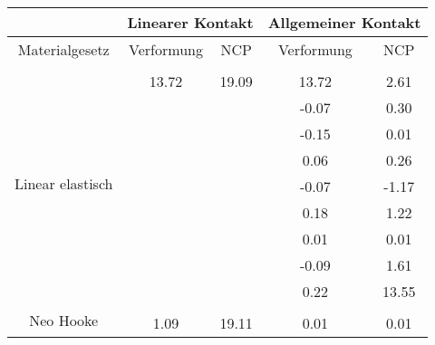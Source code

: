 \begin{table} 
\centering 
\begin{tabular}{c|cc|cc|} 
\cline{2-5} 
 & \multicolumn{2}{|c|}{Linearer Kontakt} & \multicolumn{2}{|c|}{Allgemeiner Kontakt} \\ 
\hline 
\multicolumn{1}{|c|}{Materialgesetz} & \multicolumn{1}{c|}{Verformung} & \multicolumn{1}{c|}{NCP} & \multicolumn{1}{c|}{Verformung} & \multicolumn{1}{c|}{NCP} \\ 
\hline 
\multicolumn{1}{|c|}{\multirow{10}{*}{Linear elastisch}} &\multicolumn{1}{|c|}{} & \multicolumn{1}{|c|}{} & \multicolumn{1}{|c|}{} & \multicolumn{1}{|c|}{} \\ 
\multicolumn{1}{|c|}{} & \multicolumn{1}{|c|}{     13.72} & \multicolumn{1}{|c|}{     19.09} & \multicolumn{1}{|c|}{     13.72} & \multicolumn{1}{|c|}{      2.61} \\ 
\multicolumn{1}{|c|}{} & \multicolumn{1}{|c|}{} & \multicolumn{1}{|c|}{} & \multicolumn{1}{|c|}{     -0.07} & \multicolumn{1}{|c|}{      0.30} \\ 
\multicolumn{1}{|c|}{} & \multicolumn{1}{|c|}{} & \multicolumn{1}{|c|}{} & \multicolumn{1}{|c|}{     -0.15} & \multicolumn{1}{|c|}{      0.01} \\ 
\multicolumn{1}{|c|}{} & \multicolumn{1}{|c|}{} & \multicolumn{1}{|c|}{} & \multicolumn{1}{|c|}{      0.06} & \multicolumn{1}{|c|}{      0.26} \\ 
\multicolumn{1}{|c|}{} & \multicolumn{1}{|c|}{} & \multicolumn{1}{|c|}{} & \multicolumn{1}{|c|}{     -0.07} & \multicolumn{1}{|c|}{     -1.17} \\ 
\multicolumn{1}{|c|}{} & \multicolumn{1}{|c|}{} & \multicolumn{1}{|c|}{} & \multicolumn{1}{|c|}{      0.18} & \multicolumn{1}{|c|}{      1.22} \\ 
\multicolumn{1}{|c|}{} & \multicolumn{1}{|c|}{} & \multicolumn{1}{|c|}{} & \multicolumn{1}{|c|}{      0.01} & \multicolumn{1}{|c|}{      0.01} \\ 
\multicolumn{1}{|c|}{} & \multicolumn{1}{|c|}{} & \multicolumn{1}{|c|}{} & \multicolumn{1}{|c|}{     -0.09} & \multicolumn{1}{|c|}{      1.61} \\ 
\multicolumn{1}{|c|}{} & \multicolumn{1}{|c|}{} & \multicolumn{1}{|c|}{} & \multicolumn{1}{|c|}{      0.22} & \multicolumn{1}{|c|}{     13.55} \\ 
\hline 
\multicolumn{1}{|c|}{\multirow{9}{*}{Neo Hooke}} &\multicolumn{1}{|c|}{} & \multicolumn{1}{|c|}{} & \multicolumn{1}{|c|}{} & \multicolumn{1}{|c|}{} \\ 
\multicolumn{1}{|c|}{} & \multicolumn{1}{|c|}{      1.09} & \multicolumn{1}{|c|}{     19.11} & \multicolumn{1}{|c|}{      0.01} & \multicolumn{1}{|c|}{      0.01} \\ 

\end{tabular}
\end{table}
